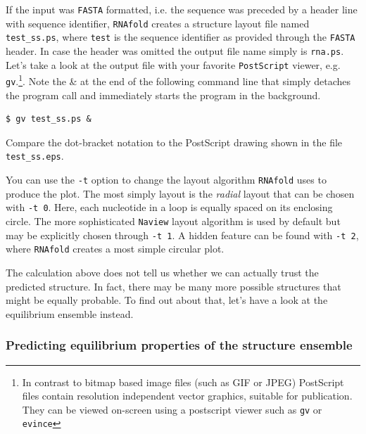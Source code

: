 \documentclass[a4paper]{article}
\begin{document}
If the input was \texttt{FASTA} formatted, i.e. the sequence was preceded by a header line
with sequence identifier, \texttt{RNAfold} creates a structure layout file named \texttt{test\_ss.ps},
where \texttt{test} is the sequence identifier as provided through the \texttt{FASTA} header.
In case the header was omitted the output file name simply is \texttt{rna.ps}.\\
Let's take a look at the output file with your favorite \texttt{PostScript} viewer, e.g. \texttt{gv}.\footnote{In contrast to
  bitmap based image files (such as GIF or JPEG) PostScript files contain resolution
  independent vector graphics, suitable for publication. They can be
  viewed on-screen using a postscript viewer such as \texttt{gv} or
  \texttt{evince}}. Note the \& at the end of the following command line that simply detaches
the program call and immediately starts the program in the background.
\begin{verbatim}
$ gv test_ss.ps & 
\end{verbatim}
\noindent
Compare the dot-bracket notation to the PostScript
drawing shown in the file \texttt{test\_ss.eps}.

You can use the \texttt{-t} option to change the layout algorithm \texttt{RNAfold} uses
to produce the plot. The most simply layout is the \textit{radial} layout that can be chosen
with \texttt{-t 0}. Here, each nucleotide in a loop is equally spaced on its enclosing circle.
The more sophisticated \texttt{Naview} layout algorithm is used by default but may be explicitly
chosen through \texttt{-t 1}. A hidden feature can be found with \texttt{-t 2}, where \texttt{RNAfold}
creates a most simple circular plot.

The calculation above does not tell us whether we can actually trust the predicted structure.
In fact, there may be many more possible structures that might be equally probable. To find
out about that, let's have a look at the equilibrium ensemble instead.

\subsubsection{Predicting equilibrium properties of the structure ensemble}
\end{document}
